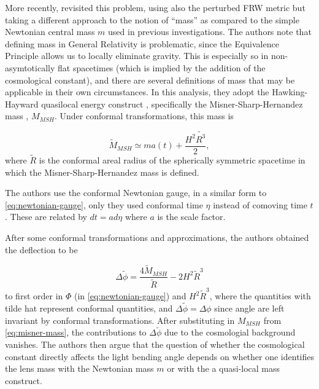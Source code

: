 More recently, \citet{Faraoni2017} revisited this problem, using also the perturbed FRW metric but taking a different approach to the notion of ``mass'' as compared to the simple Newtonian central mass $m$ used in previous investigations. The authors note that defining mass in General Relativity is problematic, since the Equivalence Principle allows us to locally eliminate gravity. This is especially so in non-asymtotically flat spacetimes (which is implied by the addition of the cosmological constant), and there are several definitions of mass that may be applicable in their own circumstances. In this analysis, they adopt the Hawking-Hayward quasilocal energy construct \citep{Hawking1968,Hayward1994}, specifically the Misner-Sharp-Hernandez mass \citep{Misner1964}, $M_{MSH}$. Under conformal transformations, this mass is

\begin{equation}
  \tilde{M}_{MSH} \simeq ma(t) + \frac{H^2 \tilde{R^3}}{2},
  \label{eq:misner-mass}
\end{equation}
where $\tilde{R}$ is the conformal areal radius of the spherically symmetric spacetime in which the Misner-Sharp-Hernandez mass is defined. 

The authors use the conformal Newtonian gauge, in a similar form to \eqref{eq:newtonian-gauge}, only they used conformal time $\eta$ instead of comoving time $t$. These are related by $dt = a d\eta$ where $a$ is the scale factor. 

After some conformal transformations and approximations, the authors obtained the deflection to be

\begin{equation}
  \Delta \tilde{\phi} = \frac{4\tilde{M}_{MSH}}{\tilde{R}} - 2H^2 \tilde{R}^3
  \label{eq:faraoni-angle}
\end{equation}
to first order in $\Phi$ (in \eqref{eq:newtonian-gauge}) and $H^2\tilde{R}^3$,  where the quantities with tilde hat represent conformal quantities, and $\Delta \tilde{\phi} = \Delta \phi$ since angle are left invariant by conformal transformations. After substituting in $M_{MSH}$ from \eqref{eq:misner-mass}, the contributions to $\Delta \tilde{\phi}$ due to the cosmologial background vanishes. The authors then argue that the question of whether the cosmological constant directly affects the light bending angle depends on whether one identifies the lens mass with the Newtonian mass $m$ or with the a quasi-local mass construct.
